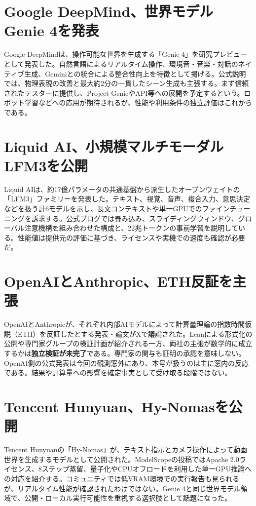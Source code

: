 \section{Google DeepMind、世界モデルGenie 4を発表}
Google DeepMindは、操作可能な世界を生成する「Genie 4」を研究プレビューとして発表した。自然言語によるリアルタイム操作、環境音・音楽・対話のネイティブ生成、Geminiとの統合による整合性向上を特徴として掲げる。公式説明では、物理表現の改善と最大約2分の一貫したシーン生成も主張する。まず信頼されたテスターに提供し、Project GenieやAPI等への展開を予定するという。ロボット学習などへの応用が期待されるが、性能や利用条件の独立評価はこれからである。

\section{Liquid AI、小規模マルチモーダルLFM3を公開}
Liquid AIは、約17億パラメータの共通基盤から派生したオープンウェイトの「LFM3」ファミリーを発表した。テキスト、視覚、音声、複合入力、意思決定などを扱う計6モデルを示し、長文コンテキストや単一GPUでのファインチューニングを訴求する。公式ブログでは畳み込み、スライディングウィンドウ、グローバル注意機構を組み合わせた構成と、22兆トークンの事前学習を説明している。性能値は提供元の評価に基づき、ライセンスや実機での速度も確認が必要だ。

\section{OpenAIとAnthropic、ETH反証を主張}
OpenAIとAnthropicが、それぞれ内部AIモデルによって計算量理論の指数時間仮説（ETH）を反証したとする発表・論文がXで議論された。Leanによる形式化の公開や専門家グループの検証計画が紹介される一方、両社の主張が数学的に成立するかは\textbf{独立検証が未完了}である。専門家の関与も証明の承認を意味しない。OpenAI側の公式発表は今回の観測窓外にあり、本号が扱うのは主に窓内の反応である。結果や計算量への影響を確定事実として受け取る段階ではない。

\section{Tencent Hunyuan、Hy-Nomasを公開}
Tencent Hunyuanの「Hy-Nomas」が、テキスト指示とカメラ操作によって動画世界を生成するモデルとして公開された。ModelScopeの投稿ではApache 2.0ライセンス、8ステップ蒸留、量子化やCPUオフロードを利用した単一GPU推論への対応を紹介する。コミュニティでは低VRAM環境での実行報告も見られるが、リアルタイム性能が確認されたわけではない。Genie 4と同じ世界モデル領域で、公開・ローカル実行可能性を重視する選択肢として話題になった。

